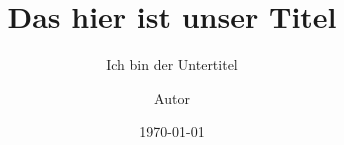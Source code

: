 \documentclass[12pt, a4paper]{scrartcl}
\begin{document}
    \title{Das hier ist unser Titel}
    \subtitle{Ich bin der Untertitel}
    \author{Autor}
    \publishers{Herausgeber}
    \date{\today}

    \maketitle

    \blinddocument
\end{document}
